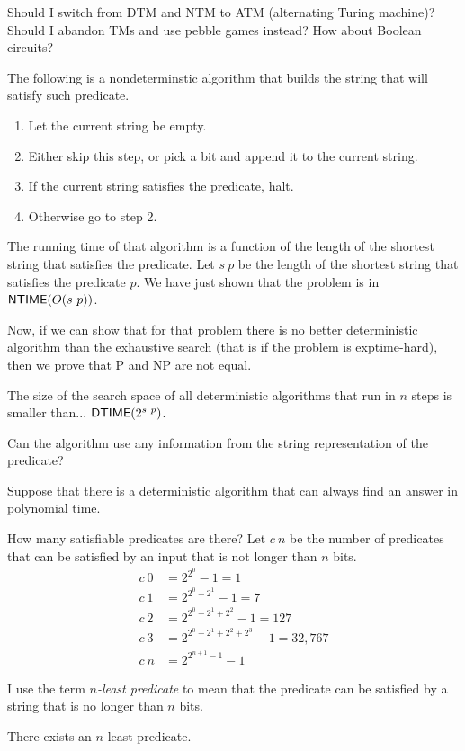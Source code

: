Should I switch from DTM and NTM to ATM (alternating Turing machine)?
Should I abandon TMs and use pebble games instead?
How about Boolean circuits?

The following is a nondeterminstic algorithm that
builds the string that will satisfy such predicate.
\begin{enumerate}
\item Let the current string be empty.
\item Either skip this step,
or pick a bit and append it to the current string.
\item If the current string satisfies the predicate, halt.
\item Otherwise go to step 2.
\end{enumerate}
The running time of that algorithm is a function of the length
of the shortest string that satisfies the predicate.
Let $s~p$ be the length of the shortest string that satisfies the predicate $p$.
We have just shown that the problem is in $\operatorname{\mathsf{NTIME}}(O(s~p))$.

Now, if we can show that for that problem
there is no better deterministic algorithm than the exhaustive search
(that is if the problem is exptime-hard),
then we prove that P and NP are not equal.

The size of the search space of all deterministic algorithms
that run in $n$ steps is smaller than...
$\operatorname{\mathsf{DTIME}}(2^{s~p})$.

Can the algorithm use any information from
the string representation of the predicate?

Suppose that there is a deterministic algorithm that can
always find an answer in polynomial time.

How many satisfiable predicates are there?
Let $c~n$ be the number of predicates that can be satisfied
by an input that is not longer than $n$ bits.
\begin{align}
  c~0 &= 2^{2^0} - 1 = 1
  \\
  c~1 &= 2^{2^0 + 2^1} - 1 = 7
  \\
  c~2 &= 2^{2^0 + 2^1 + 2^2} - 1 = 127
  \\
  c~3 &= 2^{2^0 + 2^1 + 2^2 + 2^3} - 1 = 32,767
  \\
  c~n &= 2^{2^{n+1}-1} - 1
\end{align}

I use the term \emph{$n$-least predicate} to mean that the predicate
can be satisfied by a string that is no longer than $n$ bits.

There exists an $n$-least predicate.

